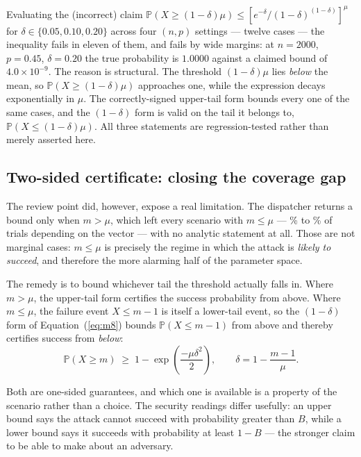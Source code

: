 \documentclass[11pt,a4paper]{article}
\newcommand{\Prob}{\mathbb{P}}
\newcommand{\eqnref}[1]{Equation~(\ref{#1})}
\begin{document}
Evaluating the (incorrect) claim
$\Prob(X \geq (1-\delta)\mu) \leq [e^{-\delta}/(1-\delta)^{(1-\delta)}]^{\mu}$
for $\delta \in \{0.05, 0.10, 0.20\}$ across four $(n,p)$ settings --- twelve
cases --- the inequality fails in eleven of them, and fails by wide margins: at
$n = 2000$, $p = 0.45$, $\delta = 0.20$ the true probability is $1.0000$
against a claimed bound of $4.0 \times 10^{-9}$. The reason is structural.
The threshold $(1-\delta)\mu$ lies \emph{below} the mean, so
$\Prob(X \geq (1-\delta)\mu)$ approaches one, while the expression decays
exponentially in $\mu$. The correctly-signed upper-tail form bounds every
one of the same cases, and the $(1-\delta)$ form is valid on the tail it
belongs to, $\Prob(X \leq (1-\delta)\mu)$. All three statements are
regression-tested rather than merely asserted here.

\subsection{Two-sided certificate: closing the coverage gap}
\label{sec:certificate}

The review point did, however, expose a real limitation. The dispatcher
returns a bound only when $m > \mu$, which left every scenario with
$m \leq \mu$ --- \LowerTailShareMin\% to \LowerTailShareMax\% of trials
depending on the vector --- with no analytic statement at all. Those are not marginal cases:
$m \leq \mu$ is precisely the regime in which the attack is \emph{likely
to succeed}, and therefore the more alarming half of the parameter space.

The remedy is to bound whichever tail the threshold actually falls in.
Where $m > \mu$, the upper-tail form certifies the success probability
from above. Where $m \leq \mu$, the failure event $X \leq m-1$ is itself
a lower-tail event, so the $(1-\delta)$ form of \eqnref{eq:m8} bounds
$\Prob(X \leq m-1)$ from above and thereby certifies success from
\emph{below}:
\begin{equation}
\Prob(X \geq m) \;\geq\; 1 - \exp\!\left(\frac{-\mu\delta^{2}}{2}\right),
\qquad \delta = 1 - \frac{m-1}{\mu} .
\label{eq:certificate}
\end{equation}

Both are one-sided guarantees, and which one is available is a property
of the scenario rather than a choice. The security readings differ
usefully: an upper bound says the attack cannot succeed with probability
greater than $B$, while a lower bound says it succeeds with probability
at least $1-B$ --- the stronger claim to be able to make about an
adversary.
\end{document}
